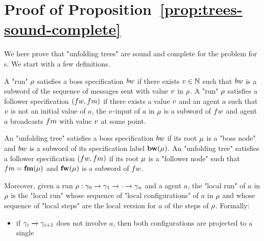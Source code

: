 \section{Proof of Proposition~\ref{prop:trees-sound-complete}}
\label{app:trees-sound-complete}

We here prove that "unfolding trees" are sound and complete for the \COVER problem for \BNRA{}s. 
We start with a few definitions. 

A "run" $\rho$ satisfies a boss specification $\bossspec$ if there exists $v \in \mathbb{N}$ such that $\bossspec$ is a subword of the sequence of messages sent with value $v$ in $\rho$.
A "run" $\rho$ satisfies a follower specification $(\followwordspec, \followmessagespec)$ if there exists a value $v$ and an agent $a$ such that $v$ is not an initial value of $a$, the $v$-input of $a$ in $\rho$ is a subword of $\followwordspec$ and agent $a$ broadcasts $\followmessagespec$ with value $v$ at some point.

An "unfolding tree" satisfies a boss specification $\bossspec$ if its root $\mu$ is a "boss node" and $\bossspec$ is a subword of its specification label $\mathbf{bw}(\mu)$.
An "unfolding tree" satisfies a follower specification $(\followwordspec, \followmessagespec)$ if its root $\mu$ is a "follower node" such that $\followmessagespec=\followlabelmessage{\node}$ and  $\mathbf{fw}(\mu)$ is a subword of $\followwordspec$.

Moreover, given a run $\rho: \gamma_0 \xrightarrow{} \gamma_1 \xrightarrow{} \cdot \xrightarrow{}\gamma_n$ and a agent $a$, the "local run" of $a$ in $\rho$ is the "local run" whose sequence of "local configurations" of $a$ in $\rho$ and whose sequence of "local steps" are the local version for $a$ of the steps of $\rho$. Formally:
\begin{itemize}
\item if $\gamma_i \xrightarrow{} \gamma_{i+1}$ does not involve $a$, then both configurations are projected to a single 
\end{itemize}


